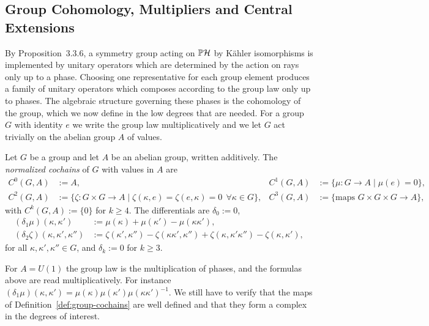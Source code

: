 \subsection{Group Cohomology, Multipliers and Central Extensions}\label{subsec:group-cohomology}

By Proposition~3.3.6, a symmetry group acting on $\mathbb{P}\H$ by Kähler isomorphisms is implemented by unitary operators which are determined by the action on rays only up to a phase. Choosing one representative for each group element produces a family of unitary operators which composes according to the group law only up to phases. The algebraic structure governing these phases is the cohomology of the group, which we now define in the low degrees that are needed. For a group $G$ with identity $e$ we write the group law multiplicatively and we let $G$ act trivially on the abelian group $A$ of values.

\begin{definition}\label{def:group-cochains}
	Let $G$ be a group and let $A$ be an abelian group, written additively. The \emph{normalized cochains} of $G$ with values in $A$ are
	\begin{align*}
		C^0(G,A)&:=A, & C^1(G,A)&:=\{\mu:G\to A\mid\mu(e)=0\},\\
		C^2(G,A)&:=\{\zeta:G\times G\to A\mid\zeta(\kappa,e)=\zeta(e,\kappa)=0\ \ \forall\kappa\in G\}, & C^3(G,A)&:=\{\text{maps }G\times G\times G\to A\},
	\end{align*}
	with $C^k(G,A):=\{0\}$ for $k\geq4$. The differentials are $\delta_0:=0$,
	\begin{align*}
		(\delta_1\mu)(\kappa,\kappa')&:=\mu(\kappa)+\mu(\kappa')-\mu(\kappa\kappa'),\\
		(\delta_2\zeta)(\kappa,\kappa',\kappa'')&:=\zeta(\kappa',\kappa'')-\zeta(\kappa\kappa',\kappa'')+\zeta(\kappa,\kappa'\kappa'')-\zeta(\kappa,\kappa'),
	\end{align*}
	for all $\kappa,\kappa',\kappa''\in G$, and $\delta_k:=0$ for $k\geq3$.
\end{definition}

For $A=U(1)$ the group law is the multiplication of phases, and the formulas above are read multiplicatively. For instance $(\delta_1\mu)(\kappa,\kappa')=\mu(\kappa)\mu(\kappa')\mu(\kappa\kappa')^{-1}$. We still have to verify that the maps of Definition~\ref{def:group-cochains} are well defined and that they form a complex in the degrees of interest.

